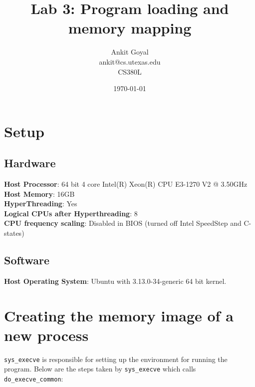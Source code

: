 \documentclass[10pt] {article}
\author{Ankit Goyal \\ankit@cs.utexas.edu \\ CS380L}
\title{Lab 3: Program loading and memory mapping}
\date{\today}
\begin{document}
\maketitle

\section{Setup}
\subsection{Hardware}
\textbf{Host Processor}: 64 bit 4 core Intel(R) Xeon(R) CPU E3-1270 V2 @ 3.50GHz\\
\textbf{Host Memory}: 16GB \\
\textbf{HyperThreading}: Yes \\
\textbf{Logical CPUs after Hyperthreading}: 8 \\
\textbf{CPU frequency scaling}: Disabled in BIOS (turned off Intel SpeedStep and C-states)

\subsection{Software}
\textbf{Host Operating System}: Ubuntu with 3.13.0-34-generic 64 bit kernel.\\

\section{Creating the memory image of a new process}

\texttt{sys\_execve} is responsible for setting up the environment for running the program. Below are the steps taken by \texttt{sys\_execve} which calls  \texttt{do\_execve\_common}:
\end{document}
